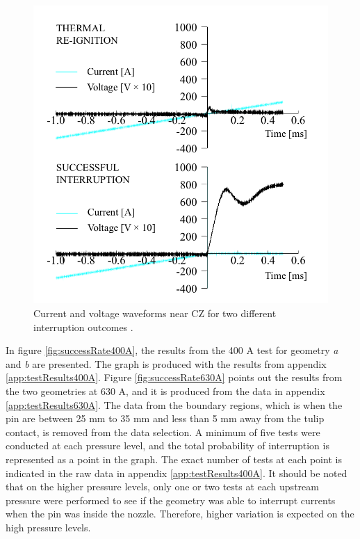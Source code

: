 \documentclass[10pt,a4paper,twoside]{article}
\begin{document}
\begin{figure}[H]
\centering
\includegraphics[scale=0.28]{Bilder/Results/differentInterruptions.png}
\caption{Current and voltage waveforms near CZ for two different interruption outcomes \cite{bib:AFIMVLBA}.} \label{fig:CurrentAndVoltageWaveform}
\end{figure}

In figure \ref{fig:successRate400A}, the results from the 400 A test for geometry \textit{a} and \textit{b} are presented. The graph is produced with the results from appendix \ref{app:testResults400A}. Figure \ref{fig:successRate630A} points out the results from the two geometries at 630 A, and it is produced from the data in appendix \ref{app:testResults630A}. The data from the boundary regions, which is when the pin are between 25 mm to 35 mm and less than 5 mm away from the tulip contact, is removed from the data selection. A minimum of five tests were conducted at each pressure level, and the total probability of interruption is represented as a point in the graph. The exact number of tests at each point is indicated in the raw data in appendix \ref{app:testResults400A}. It should be noted that on the higher pressure levels, only one or two tests at each upstream pressure were performed to see if the geometry was able to interrupt currents when the pin was inside the nozzle. Therefore, higher variation is expected on the high pressure levels. 
\end{document}
